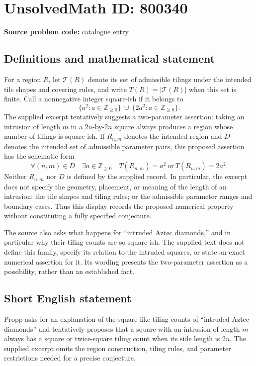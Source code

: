\documentclass[11pt]{article}
\begin{document}
\section*{UnsolvedMath ID: 800340}
\textbf{Source problem code:} catalogue entry
\subsection{Definitions and mathematical statement}
For a region \(R\), let \(\mathcal{T}(R)\) denote its set of admissible tilings under the intended tile shapes and covering rules, and write \(T(R)=|\mathcal{T}(R)|\) when this set is finite. Call a nonnegative integer square-ish if it belongs to
\[
\{a^2:a\in\mathbb{Z}_{\geq 0}\}\ \cup\ \{2a^2:a\in\mathbb{Z}_{\geq 0}\}.
\]
The supplied excerpt tentatively suggests a two-parameter assertion: taking an intrusion of length \(m\) in a \(2n\)-by-\(2n\) square always produces a region whose number of tilings is square-ish. If \(R_{n,m}\) denotes the intended region and \(D\) denotes the intended set of admissible parameter pairs, this proposed assertion has the schematic form
\[
\forall (n,m)\in D\quad \exists a\in\mathbb{Z}_{\geq 0}\quad
T(R_{n,m})=a^2\ \text{or}\ T(R_{n,m})=2a^2.
\]
Neither \(R_{n,m}\) nor \(D\) is defined by the supplied record. In particular, the excerpt does not specify the geometry, placement, or meaning of the length of an intrusion; the tile shapes and tiling rules; or the admissible parameter ranges and boundary cases. Thus this display records the proposed numerical property without constituting a fully specified conjecture.

The source also asks what happens for ``intruded Aztec diamonds,'' and in particular why their tiling counts are so square-ish. The supplied text does not define this family, specify its relation to the intruded squares, or state an exact numerical assertion for it. Its wording presents the two-parameter assertion as a possibility, rather than an established fact.
\subsection{Short English statement}
Propp asks for an explanation of the square-like tiling counts of ``intruded Aztec diamonds'' and tentatively proposes that a square with an intrusion of length \(m\) always has a square or twice-square tiling count when its side length is \(2n\). The supplied excerpt omits the region construction, tiling rules, and parameter restrictions needed for a precise conjecture.
\end{document}
